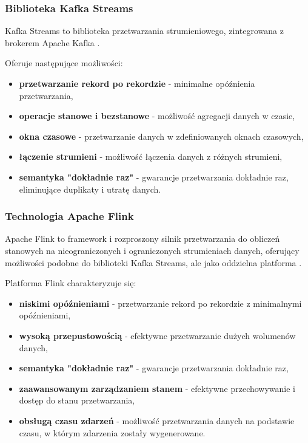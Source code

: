 \subsubsection{Biblioteka Kafka Streams}
\label{subsubsec:kafka_streams}

Kafka Streams to biblioteka przetwarzania strumieniowego, zintegrowana z brokerem Apache Kafka \cite{kafka_streams}. 

\vspace{0.3em}

Oferuje następujące możliwości:

\begin{itemize}
    \item \textbf{przetwarzanie rekord po rekordzie} - minimalne opóźnienia przetwarzania,
    \item \textbf{operacje stanowe i bezstanowe} - możliwość agregacji danych w czasie,
    \item \textbf{okna czasowe} - przetwarzanie danych w zdefiniowanych oknach czasowych,
    \item \textbf{łączenie strumieni} - możliwość łączenia danych z różnych strumieni,
    \item \textbf{semantyka "dokładnie raz"} - gwarancje przetwarzania dokładnie raz, eliminujące duplikaty i utratę danych.
\end{itemize}

\subsubsection{Technologia Apache Flink}
\label{subsubsec:apache_flink}

Apache Flink to framework i rozproszony silnik przetwarzania do obliczeń stanowych na nieograniczonych i ograniczonych strumieniach danych, oferujący możliwości podobne do biblioteki Kafka Streams,
ale jako oddzielna platforma \cite{flink}. 

\vspace{0.3em}

Platforma Flink charakteryzuje się:

\begin{itemize}
    \item \textbf{niskimi opóźnieniami} - przetwarzanie rekord po rekordzie z minimalnymi opóźnieniami,
    \item \textbf{wysoką przepustowością} - efektywne przetwarzanie dużych wolumenów danych,
    \item \textbf{semantyka "dokładnie raz"} - gwarancje przetwarzania dokładnie raz,
    \item \textbf{zaawansowanym zarządzaniem stanem} - efektywne przechowywanie i dostęp do stanu przetwarzania,
    \item \textbf{obsługą czasu zdarzeń} - możliwość przetwarzania danych na podstawie czasu, w którym zdarzenia zostały wygenerowane.
\end{itemize}

